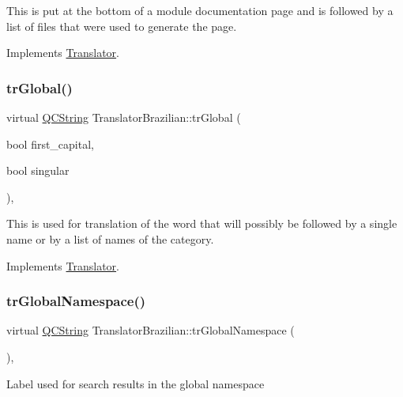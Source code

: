 This is put at the bottom of a module documentation page and is followed by a list of files that were used to generate the page. 

Implements \mbox{\hyperlink{class_translator}{Translator}}.

\mbox{\label{class_translator_brazilian_a85b8191fdcb666f2ce94e75da038375e}} 
\subsubsection{\texorpdfstring{trGlobal()}{trGlobal()}}
{\footnotesize\ttfamily virtual \mbox{\hyperlink{class_q_c_string}{Q\+C\+String}} Translator\+Brazilian\+::tr\+Global (\begin{DoxyParamCaption}\item[{bool}]{first\+\_\+capital,  }\item[{bool}]{singular }\end{DoxyParamCaption})\hspace{0.3cm}{\ttfamily [inline]}, {\ttfamily [virtual]}}

This is used for translation of the word that will possibly be followed by a single name or by a list of names of the category. 

Implements \mbox{\hyperlink{class_translator}{Translator}}.

\mbox{\label{class_translator_brazilian_a9187ab33c6ec57b578936a8df0501c98}} 
\subsubsection{\texorpdfstring{trGlobalNamespace()}{trGlobalNamespace()}}
{\footnotesize\ttfamily virtual \mbox{\hyperlink{class_q_c_string}{Q\+C\+String}} Translator\+Brazilian\+::tr\+Global\+Namespace (\begin{DoxyParamCaption}{ }\end{DoxyParamCaption})\hspace{0.3cm}{\ttfamily [inline]}, {\ttfamily [virtual]}}

Label used for search results in the global namespace 

